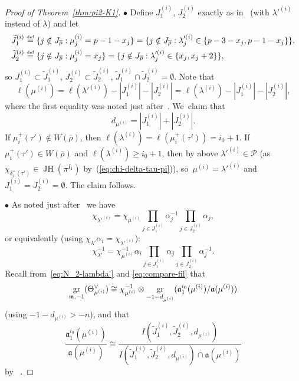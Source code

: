 \documentclass[JEP,XML,SOM,Unicode,NoFloatCountersInSection, NoEqCountersInSection,published]{cedram}
\newcommand{\sbullet}{{\scriptscriptstyle\bullet}}
\let\wt\widetilde
\newcommand{\defeq}{\stackrel{\textrm{\tiny{\upshape{def}}}}{=}}
\renewcommand{\P}{\mathscr P}
\newcommand{\brho}{\overline{\rho}}
\DeclareMathOperator{\gr}{gr}
\DeclareMathOperator{\JH}{\mathrm{JH}}
\theoremstyle{plain}
\theoremstyle{definition}
\begin{document}
\begin{proof}[Proof of Theorem~\ref{thm:pi2-K1}]
$\sbullet$ Define $J_1^{(i)}$, $J_2^{(i)}$ exactly as in~\cite[Eq.\,(60)]{BHHMS4} (with $\lambda'^{(i)}$ instead of $\lambda$) and let
\begin{align*}
\wt J_1^{(i)} &\defeq \{j \notin J_{\brho}: \mu^{(i)}_j = p-1-x_j \} = \{j \notin J_{\brho}: \lambda'^{(i)}_j \in \{ p-3-x_j,p-1-x_j \}\}, \\
\wt J_2^{(i)} &\defeq \{j \notin J_{\brho}: \mu^{(i)}_j = x_j \} = \{j \notin J_{\brho}: \lambda'^{(i)}_j \in \{ x_j,x_j+2 \}\},
\end{align*}
so $J_1^{(i)} \subset \wt J_1^{(i)}$, $J_2^{(i)} \subset \wt J_2^{(i)}$, $\wt J_1^{(i)} \cap \wt J_2^{(i)} = \emptyset$.
Note that
\[
\ell(\mu^{(i)}) = \ell(\lambda'^{(i)})-|J_1^{(i)}|-|J_2^{(i)}| = \ell(\lambda^{(i)})-|J_1^{(i)}|-|J_2^{(i)}|,
\]
where the first equality was noted just after~\cite[Eq.\,(61)]{BHHMS4}. We~claim that
\begin{equation}\label{eq:d-mu-i}
d_{\mu^{(i)}} = |J_1^{(i)}|+|J_2^{(i)}|.
\end{equation}
If $\mu_i^+(\tau') \notin W(\brho)$, then $\ell(\lambda^{(i)}) = \ell(\mu_i^+(\tau')) = i_0+1$.
If $\mu_i^+(\tau') \in W(\brho)$ and $\ell(\lambda^{(i)}) \ge i_0+1$, then by above $\lambda'^{(i)} \in \P$ (as $\chi_{\delta_i^+(\tau')} \in \JH(\pi^{I_1})$ by~(\ref{eq:chi-delta-tau-pi})), so~$\mu^{(i)} = \lambda'^{(i)}$ and $J_1^{(i)} = J_2^{(i)} = \emptyset$.
The claim follows.

$\sbullet$ As noted just after~\cite[Eq.\,(61)]{BHHMS4} we have
\[
\chi_{\lambda'^{(i)}} = \chi_{\mu^{(i)}} \prod_{j \in J_1^{(i)}} \alpha_j^{-1} \prod_{j \in J_2^{(i)}} \alpha_j,
\]
or equivalently (using $\chi_{\lambda'} \alpha_i = \chi_{\lambda'^{(i)}}$):
\begin{equation}\label{eq:chi-lambda'}
\chi_{\lambda'}^{-1} = \chi_{\mu^{(i)}}^{-1} \alpha_i \prod_{j \in J_1^{(i)}} \alpha_j \prod_{j \in J_2^{(i)}} \alpha_j^{-1}.
\end{equation}
Recall from~\eqref{eq:N_2-lambda'} and \eqref{eq:compare-fil} that
\[
\gr_{\m,-1}(\Theta_{\mu^{(i)}}^\vee) \cong \chi_{\mu^{(i)}}^{-1} \otimes \gr_{-1-d_{\mu^{(i)}}}(\mathfrak{a}_1^{i_0}(\mu^{(i)})/\mathfrak{a}(\mu^{(i)}))
\]
(using $-1-d_{\mu^{(i)}} > -n$), and that
\begin{equation}\label{eq:a1-mod-a}
\frac{\mathfrak{a}_1^{i_0}(\mu^{(i)})}{\mathfrak{a}(\mu^{(i)})} \cong \frac{I(\wt J_1^{(i)},\wt J_2^{(i)},d_{\mu^{(i)}})}{I(\wt J_1^{(i)},\wt J_2^{(i)},d_{\mu^{(i)}}) \cap \mathfrak{a}(\mu^{(i)})}
\end{equation}
by \ \cite[Eq.\,(77)]{BHHMS4}.


\end{proof}
\end{document}
